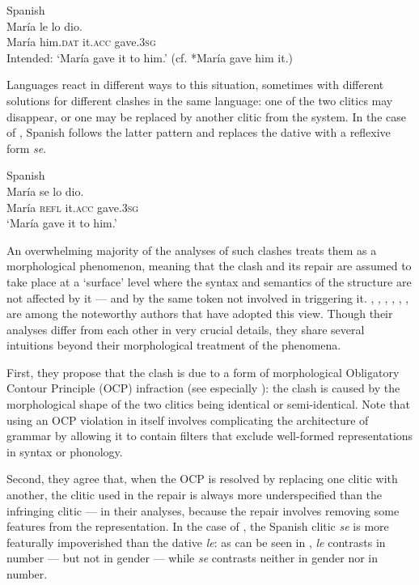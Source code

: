 \documentclass[output=paper,modfonts,nonflat,newtxmath,colorlinks,citecolor=brown]{langsci/langscibook}
\begin{document}
\ea %
    \label{ex:cabre:1}
    Spanish\\
    \gll * María le lo dio.  \\
        { } {María} {him.\textsc{dat}}  it.\textsc{acc}  gave.\textsc{3sg}\\
         \glt { } Intended: ‘María gave it to him.’ (cf. *{María} {gave} {him} {it}.)
    \z


Languages react in different ways to this situation, sometimes with different solutions for different clashes in the same language: one of the two clitics may disappear, or one may be replaced by another clitic from the system. In the case of , Spanish follows the latter pattern and replaces the dative with a reflexive form \textit{se}.

\ea%
    \label{ex:cabre:2}
     Spanish \\
    \gll María  se  lo    dio.\\
        {María}  \textsc{refl}  it.\textsc{acc}  gave.3\textsc{sg}\\
    \glt ‘María gave it to him.’
    \z



 An overwhelming majority of the analyses of such clashes treats them as a morphological phenomenon, meaning that the clash and its repair are assumed to take place at a `surface' level where the syntax and semantics of the structure are not affected by it — and by the same token not involved in triggering it. \citet{Perlmutter1971}, \citet{Bonet1991}, \citet{Bonet1993}, \citet{Bonet1995}, \citet{Grimshaw1997}, \citet{Pescarini2007}, \citet{Nevins2012} are among the noteworthy authors that have adopted this view. Though their analyses differ from each other in very crucial details, they share several intuitions beyond their morphological treatment of the phenomena.

First, they propose that the clash is due to a form of morphological Obligatory Contour Principle (OCP) infraction (see especially \citealt{Nevins2012}): the clash is caused by the morphological shape of the two clitics being identical or semi-identical. Note that using an OCP violation in itself involves complicating the architecture of grammar by allowing it to contain filters that exclude well-formed representations in syntax or phonology.

Second, they agree that, when the OCP is resolved by replacing one clitic with another, the clitic used in the repair is always more underspecified than the infringing clitic — in their analyses, because the repair involves removing some features from the representation. In the case of , the Spanish clitic \textit{se} is more featurally impoverished than the dative \textit{le}: as can be seen in , \textit{le} contrasts in number — but not in gender — while \textit{se} contrasts neither in gender nor in number.
\end{document}
